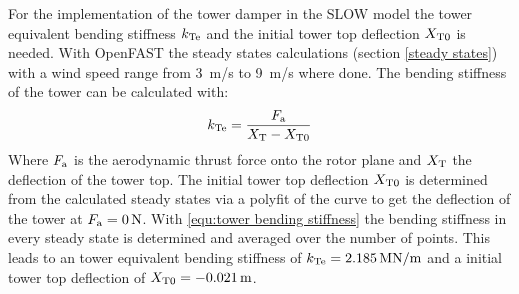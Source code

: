 For the implementation of the tower damper in the SLOW model the tower equivalent bending stiffness $k_\textnormal{Te}$ and the initial tower top deflection $X_\textnormal{T0}$ is needed. 
With OpenFAST the steady states calculations (section \ref{steady states}) with a wind speed range from \SI{3}{m/s} to \SI{9}{m/s} where done.
The bending stiffness of the tower can be calculated with: 
\begin{equation}
	k_{\textnormal{Te}} = \frac{F_\textnormal{a}}{X_\textnormal{T} - X_{\textnormal{T0}}}
	\label{equ:tower bending stiffness}
\end{equation}
Where $F_\textnormal{a}$ is the aerodynamic thrust force onto the rotor plane and $X_\textnormal{T}$ the deflection of the tower top.
The initial tower top deflection $X_\textnormal{T0}$ is determined from the calculated steady states via a polyfit of the curve to get the deflection of the tower at $F_\textnormal{a} = \SI{0}{N}$.
With \ref{equ:tower bending stiffness} the bending stiffness in every steady state is determined and averaged over the number of points. 
This leads to an tower equivalent bending stiffness of $k_\textnormal{Te} = \SI{2.185}{\mega \newton /\meter}$ and a initial tower top deflection of $X_\textnormal{T0} = \SI{-0.021}{m}$.
